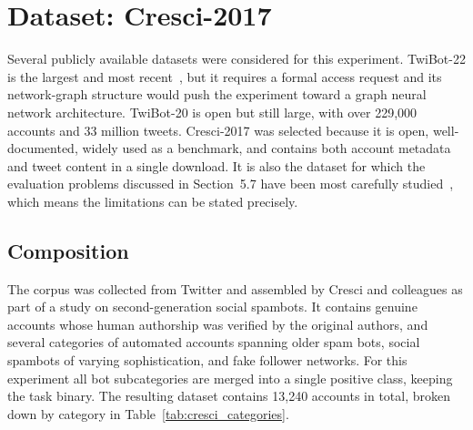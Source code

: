 \section{Dataset: Cresci-2017}
\label{sec:cresci}

Several publicly available datasets were considered for this experiment.
TwiBot-22 is the largest and most recent~\cite{AZS+23}, but it requires a
formal access request and its network-graph structure would push the
experiment toward a graph neural network architecture. TwiBot-20 is open but
still large, with over 229,000 accounts and 33 million tweets. Cresci-2017
was selected because it is open, well-documented, widely used as a
benchmark, and contains both account metadata and tweet content in a single
download. It is also the dataset for which the evaluation problems discussed
in Section~5.7 have been most carefully studied~\cite{HSR+23}, which means
the limitations can be stated precisely.

\subsection{Composition}

The corpus was collected from Twitter and assembled by Cresci and colleagues
as part of a study on second-generation social spambots. It contains genuine
accounts whose human authorship was verified by the original authors, and
several categories of automated accounts spanning older spam bots, social
spambots of varying sophistication, and fake follower networks. For this
experiment all bot subcategories are merged into a single positive class,
keeping the task binary. The resulting dataset contains 13,240 accounts in
total, broken down by category in Table~\ref{tab:cresci_categories}.

